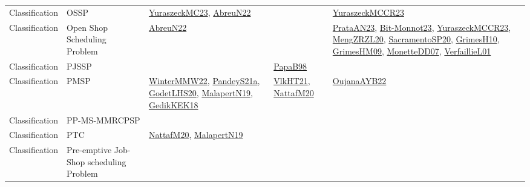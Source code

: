 {\begin{longtable}{lp{3cm}>{\raggedright}p{6cm}>{\raggedright}p{6cm}p{8cm}}
Classification & OSSP & \href{papers/YuraszeckMC23.pdf}{YuraszeckMC23}\cite{YuraszeckMC23}, \href{articles/AbreuN22.pdf}{AbreuN22}\cite{AbreuN22} &  & \href{articles/YuraszeckMCCR23.pdf}{YuraszeckMCCR23}\cite{YuraszeckMCCR23}\\
Classification & Open Shop Scheduling Problem & \href{articles/AbreuN22.pdf}{AbreuN22}\cite{AbreuN22} &  & \href{articles/PrataAN23.pdf}{PrataAN23}\cite{PrataAN23}, \href{papers/Bit-Monnot23.pdf}{Bit-Monnot23}\cite{Bit-Monnot23}, \href{articles/YuraszeckMCCR23.pdf}{YuraszeckMCCR23}\cite{YuraszeckMCCR23}, \href{articles/MengZRZL20.pdf}{MengZRZL20}\cite{MengZRZL20}, \href{articles/SacramentoSP20.pdf}{SacramentoSP20}\cite{SacramentoSP20}, \href{papers/GrimesH10.pdf}{GrimesH10}\cite{GrimesH10}, \href{papers/GrimesHM09.pdf}{GrimesHM09}\cite{GrimesHM09}, \href{papers/MonetteDD07.pdf}{MonetteDD07}\cite{MonetteDD07}, \href{papers/VerfaillieL01.pdf}{VerfaillieL01}\cite{VerfaillieL01}\\
Classification & PJSSP &  & \href{articles/PapaB98.pdf}{PapaB98}\cite{PapaB98} & \\
Classification & PMSP & \href{papers/WinterMMW22.pdf}{WinterMMW22}\cite{WinterMMW22}, \href{articles/PandeyS21a.pdf}{PandeyS21a}\cite{PandeyS21a}, \href{papers/GodetLHS20.pdf}{GodetLHS20}\cite{GodetLHS20}, \href{papers/MalapertN19.pdf}{MalapertN19}\cite{MalapertN19}, \href{articles/GedikKEK18.pdf}{GedikKEK18}\cite{GedikKEK18} & \href{articles/VlkHT21.pdf}{VlkHT21}\cite{VlkHT21}, \href{papers/NattafM20.pdf}{NattafM20}\cite{NattafM20} & \href{papers/OujanaAYB22.pdf}{OujanaAYB22}\cite{OujanaAYB22}\\
Classification & PP-MS-MMRCPSP &  &  & \\
Classification & PTC & \href{papers/NattafM20.pdf}{NattafM20}\cite{NattafM20}, \href{papers/MalapertN19.pdf}{MalapertN19}\cite{MalapertN19} &  & \\
Classification & Pre-emptive Job-Shop scheduling Problem &  &  & \\

\end{longtable}}
